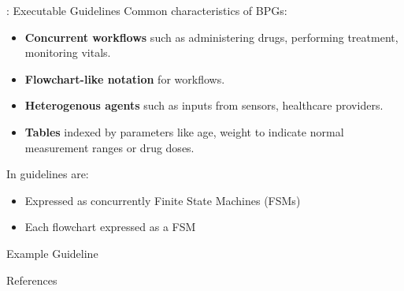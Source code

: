 \documentclass{beamer}
\begin{document}
\begin{frame}{\MediK{}: Executable Guidelines}
  Common characteristics of BPGs:
  \begin{itemize}
    \item \textbf{Concurrent workflows} such as administering
      drugs, performing treatment, monitoring vitals.
    \item \textbf{Flowchart-like notation} for workflows.
    \item \textbf{Heterogenous agents} such as inputs from sensors, healthcare
      providers.
    \item \textbf{Tables} indexed by parameters like age, weight to indicate
      normal measurement ranges or drug doses.
  \end{itemize}
  \pause
  In \MediK{} guidelines are:
  \begin{itemize}
    \item Expressed as concurrently Finite State Machines (FSMs)
    \item Each flowchart expressed as a FSM
  \end{itemize}
\end{frame}

\begin{frame}{Example \MediK{} Guideline}
\end{frame}

\begin{frame}[allowframebreaks]{References}
  
\end{frame}
\end{document}
